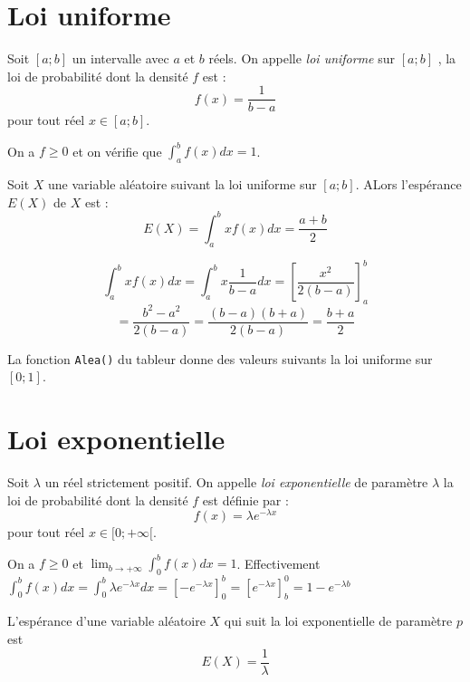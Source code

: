 \documentclass[french]{book}
\newcommand{\cro}[1]{[#1]}
\newcommand{\dx}{dx}
\begin{document}
\section{Loi uniforme}

\begin{defn}
 Soit $[a;b]$ un intervalle avec $a$ et $b$ réels. On appelle \emph{loi uniforme} sur $[a;b]$ , la loi de probabilité dont la densité $f$ est :
$$f(x)=\frac{1}{b-a}$$ pour tout réel $x\in[a;b]$.
\end{defn}

\begin{demo}
 On a $f\geq 0$ et on vérifie que $\int_{a}^{b}f(x)\dx=1$.
\end{demo}


\begin{prop}
 Soit $X$ une variable aléatoire suivant la loi uniforme sur $[a;b]$. ALors l'espérance $E(X)$ de $X$ est :
$$E(X)=\int_{a}^{b}xf(x)\dx=\frac{a+b}{2}$$
\end{prop}

\begin{demo}
$$\int_{a}^{b}xf(x)\dx=\int_{a}^{b}x\dfrac{1}{b-a}\dx = \cro{\dfrac{x^2}{2(b-a)}}_a^b$$
$$= \dfrac{b^2-a^2}{2(b-a)}=\dfrac{(b-a)(b+a)}{2(b-a)}=\dfrac{b+a}{2}$$
\end{demo}

\begin{exemple}
 La fonction \texttt{Alea()} du tableur donne des valeurs suivants la loi uniforme sur $[0;1]$.
\end{exemple}


\section{Loi exponentielle}

\begin{defn}
 Soit $\lambda$ un réel strictement positif. On appelle \emph{loi exponentielle} de paramètre $\lambda$ la loi de probabilité dont la densité $f$ est définie par :
$$f(x)=\lambda e^{-\lambda x}$$
pour tout réel $x\in [0;+\infty[$.
\end{defn}

\begin{demo}
 On a $f\geq 0$ et $\lim_{b\rightarrow +\infty}\int_{0}^{b}f(x)\dx=1$. Effectivement
 $\int_{0}^{b}f(x)\dx=\int_{0}^{b}\lambda e^{-\lambda x} \dx= \cro{-e^{-\lambda x}}_0^b=  \cro{e^{-\lambda x}}_b^0=1-e^{-\lambda b}$
\end{demo}


\begin{prop}
 L'espérance d'une variable aléatoire $X$ qui suit la loi exponentielle de paramètre $p$ est $$E(X)=\frac{1}{\lambda}$$
\end{prop}
\end{document}
